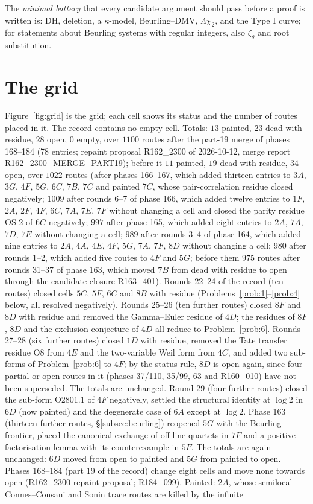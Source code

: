 \documentclass[11pt]{amsart}
\theoremstyle{definition}
\theoremstyle{remark}
\begin{document}
The \emph{minimal battery} that every candidate argument should pass before a proof is written is: DH,
deletion, a $\kappa$-model, Beurling--DMV, $\Lambda\chi_2$, and the Type I curve; for statements about Beurling systems with regular integers, also $\zeta_\theta$ and root substitution.

\section{The grid}\label{sec:grid}

Figure~\ref{fig:grid} is the grid; each cell shows its status and the number of routes placed in it.
The record contains no empty cell. Totals: $13$ painted, $23$ dead with residue, $28$ open, $0$ empty, over $1100$ routes after the part-19 merge of phases 168--184 (78 entries; repaint proposal R162\_2300 of 2026-10-12, merge report R162\_2300\_MERGE\_PART19); before it $11$ painted, $19$ dead with residue, $34$ open, over $1022$ routes (after phases 166--167, which added thirteen entries to $3A$, $3G$, $4F$, $5G$, $6C$, $7B$, $7C$ and painted $7C$, whose pair-correlation residue closed negatively; $1009$ after rounds 6--7 of phase 166, which added twelve entries to $1F$, $2A$, $2F$, $4F$, $6C$, $7A$, $7E$, $7F$ without changing a cell and closed the parity residue OS-2 of $6C$ negatively; $997$ after phase 165, which added eight entries to $2A$, $7A$, $7D$, $7E$ without changing a cell; $989$ after rounds 3--4 of phase 164, which added nine entries to $2A$, $4A$, $4E$, $4F$, $5G$, $7A$, $7F$, $8D$ without changing a cell; $980$ after rounds 1--2, which added five routes to $4F$ and $5G$; before them $975$ routes after rounds 31--37 of phase 163, which moved $7B$ from dead with residue to open through the candidate closure R163\_401). Rounds 22--24 of the record (ten routes) closed cells $5C$, $5F$, $6C$ and $8B$ with residue (Problems~\ref{prob:1}--\ref{prob:4} below, all resolved negatively). Rounds 25--26 (ten further routes) closed $8F$ and $8D$ with residue and removed the Gamma--Euler residue of $4D$; the residues of $8F$, $8D$ and the exclusion conjecture of $4D$ all reduce to Problem~\ref{prob:6}. Rounds 27--28 (six further routes) closed $1D$ with residue, removed the Tate transfer residue O8 from $4E$ and the two-variable Weil form from $4C$, and added two sub-forms of Problem~\ref{prob:6} to $4F$; by the status rule, $8D$ is open again, since four partial or open routes in it (phases 37/110, 35/99, 63 and R160\_010) have not been superseded. The totals are unchanged. Round 29 (four further routes) closed the sub-form O2801.1 of $4F$ negatively, settled the structural identity at $\log2$ in $6D$ (now painted) and the degenerate case of $6A$ except at $\log2$. Phase 163 (thirteen further routes, \S\ref{subsec:beurling}) reopened $5G$ with the Beurling frontier, placed the canonical exchange of off-line quartets in $7F$ and a positive-factorisation lemma with its counterexample in $5F$. The totals are again unchanged: $6D$ moved from open to painted and $5G$ from painted to open. Phases 168--184 (part 19 of the record) change eight cells and move none towards open (R162\_2300 repaint proposal; R184\_099). Painted: $2A$, whose semilocal Connes--Consani and Sonin trace routes are killed by the infinite 
\end{document}

